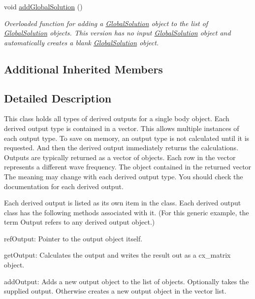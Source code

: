 \begin{DoxyCompactItemize}
\hypertarget{classosea_1_1ofreq_1_1_outputs_body_a13ae87153fcf43774b970aad94f0ca27}{void \hyperlink{classosea_1_1ofreq_1_1_outputs_body_a13ae87153fcf43774b970aad94f0ca27}{add\-Global\-Solution} ()}\label{classosea_1_1ofreq_1_1_outputs_body_a13ae87153fcf43774b970aad94f0ca27}

\begin{DoxyCompactList}\small\item\em Overloaded function for adding a \hyperlink{classosea_1_1ofreq_1_1_global_solution}{Global\-Solution} object to the list of \hyperlink{classosea_1_1ofreq_1_1_global_solution}{Global\-Solution} objects. This version has no input \hyperlink{classosea_1_1ofreq_1_1_global_solution}{Global\-Solution} object and automatically creates a blank \hyperlink{classosea_1_1ofreq_1_1_global_solution}{Global\-Solution} object. \end{DoxyCompactList}\end{DoxyCompactItemize}
\subsection*{Additional Inherited Members}


\subsection{Detailed Description}
This class holds all types of derived outputs for a single body object. Each derived output type is contained in a vector. This allows multiple instances of each output type. To save on memory, an output type is not calculated until it is requested. And then the derived output immediately returns the calculations. Outputs are typically returned as a vector of objects. Each row in the vector represents a different wave frequency. The object contained in the returned vector The meaning may change with each derived output type. You should check the documentation for each derived output.

Each derived output is listed as its own item in the class. Each derived output class has the following methods associated with it. (For this generic example, the term Output refers to any derived output object.)
\begin{DoxyEnumerate}
\item ref\-Output\-: Pointer to the output object itself.
\item get\-Output\-: Calculates the output and writes the result out as a cx\-\_\-matrix object.
\item add\-Output\-: Adds a new output object to the list of objects. Optionally takes the supplied output. Otherwise creates a new output object in the vector list.
\end{DoxyEnumerate}

